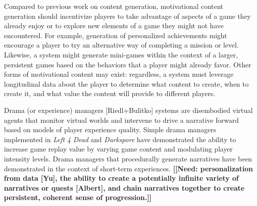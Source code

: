\documentclass[conference]{IEEEtran}
\newcommand{\mytodo}[1]{\textbf{[[#1]]}}
\begin{document}
Compared to previous work on content generation, motivational content generation should incentivize players to take advantage of aspects of a game they already enjoy or to explore new elements of a game they might not have encountered.
For example, generation of personalized achievements might encourage a player to try an alternative way of completing a mission or level.  
Likewise, a system might generate mini-games within the context of a larger, persistent games based on the behaviors that a player might already favor.   
Other forms of motivational content may exist: regardless, a system must leverage longitudinal data about the player to determine what content to create, when to create it, and what value the content will provide to different players. 

Drama (or experience) managers [Riedl+Bulitko] systems are disembodied virtual agents that monitor virtual worlds and intervene to drive a narrative forward based on models of player experience quality.
Simple drama managers implemented in {\em Left 4 Dead} and {\em Darkspore} have demonstrated the ability to increase game replay value by varying game content and modulating player intensity levels.
Drama managers that procedurally generate narratives have been demonstrated in the context of short-term experiences.
\mytodo{Need: personalization from data [Yu], the ability to create a potentially infinite variety of narratives or quests [Albert], and chain narratives together to create persistent, coherent sense of progression.}
\end{document}
